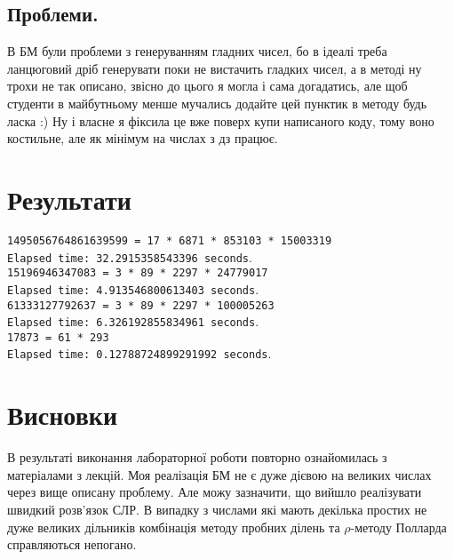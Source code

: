 \documentclass[a4paper,12pt]{article}
\begin{document}
\subsection{Проблеми.}
\tab В БМ були проблеми з генеруванням гладних чисел, бо в ідеалі треба ланцюговий дріб генерувати поки не вистачить гладких чисел, а в методі ну трохи не так описано, звісно до цього я могла і сама догадатись, але щоб студенти в майбутньому менше мучались додайте цей пунктик в методу будь ласка :)
 Ну і власне я фіксила це вже поверх купи написаного коду, тому воно костильне, але як мінімум на числах з дз працює. 
\section{Результати}

\tab\texttt{1495056764861639599 = 17 * 6871 * 853103 * 15003319\\
Elapsed time: 32.2915358543396 seconds}.\\

\texttt{15196946347083 = 3 * 89 * 2297 * 24779017\\
Elapsed time: 4.913546800613403 seconds}.\\


\texttt{61333127792637 = 3 * 89 * 2297 * 100005263\\
Elapsed time: 6.326192855834961 seconds}.\\

\texttt{17873 = 61 * 293\\
Elapsed time: 0.12788724899291992 seconds}.

\newpage
\section{Висновки}
\tab В результаті виконання лабораторної роботи повторно ознайомилась з матеріалами з лекцій. Моя реалізація БМ не є дуже дієвою на великих числах через вище описану проблему. Але можу зазначити, що вийшло реалізувати швидкий розв'язок СЛР. В випадку з числами які мають декілька простих не дуже великих дільників комбінація методу пробних ділень та  $\rho$-методу Полларда справляються непогано.
\end{document}
